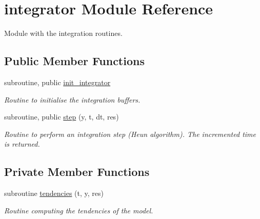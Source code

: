\hypertarget{classintegrator}{\section{integrator Module Reference}
\label{classintegrator}
}


Module with the integration routines.  


\subsection*{Public Member Functions}
\begin{DoxyCompactItemize}
\item 
subroutine, public \hyperlink{classintegrator_ab838f7567741916bedf0639b95da1d2a}{init\-\_\-integrator}
\begin{DoxyCompactList}\small\item\em Routine to initialise the integration buffers. \end{DoxyCompactList}\item 
subroutine, public \hyperlink{classintegrator_a96b886afab7eaead4e2c3e7fb1fdc50f}{step} (y, t, dt, res)
\begin{DoxyCompactList}\small\item\em Routine to perform an integration step (Heun algorithm). The incremented time is returned. \end{DoxyCompactList}\end{DoxyCompactItemize}
\subsection*{Private Member Functions}
\begin{DoxyCompactItemize}
\item 
subroutine \hyperlink{classintegrator_ae8158ec5bb2be4dca1daadb1a906ba96}{tendencies} (t, y, res)
\begin{DoxyCompactList}\small\item\em Routine computing the tendencies of the model. \end{DoxyCompactList}\end{DoxyCompactItemize}
